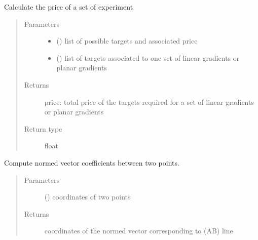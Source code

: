 \documentclass[letterpaper,10pt,english]{sphinxmanual}
\begin{document}
\begin{fulllineitems}
\label{\detokenize{ExperimentsPlannification:modules.price_calculation}}
\sphinxAtStartPar
Calculate the price of a set of experiment
\begin{quote}\begin{description}
\item[{Parameters}] \leavevmode\begin{itemize}
\item {} 
\sphinxAtStartPar
{} () \textendash{} list of possible targets and associated price

\item {} 
\sphinxAtStartPar
{} () \textendash{} list of targets associated to one set of linear gradients or planar gradients

\end{itemize}

\item[{Returns}] \leavevmode
\sphinxAtStartPar
price: total price of the targets required for a set of linear gradients or planar gradients

\item[{Return type}] \leavevmode
\sphinxAtStartPar
float

\end{description}\end{quote}

\end{fulllineitems}

\label{\detokenize{ExperimentsPlannification:module-modules}}

\begin{fulllineitems}
\label{\detokenize{ExperimentsPlannification:modules.vector_coeff}}
\sphinxAtStartPar
Compute normed vector coefficients between two points.
\begin{quote}\begin{description}
\item[{Parameters}] \leavevmode
\sphinxAtStartPar
{} () \textendash{} coordinates of two points

\item[{Returns}] \leavevmode
\sphinxAtStartPar
coordinates of the normed vector corresponding to (AB) line

\end{description}\end{quote}

\end{fulllineitems}
\end{document}
